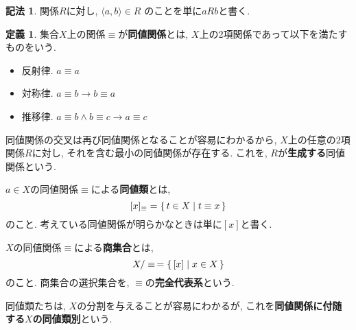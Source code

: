 \documentclass[a4paper, twoside]{bxjsarticle}
\theoremstyle{definition}
\newtheorem{defn}[thm]{定義}
\newtheorem{notation}[thm]{記法}
\begin{document}
        \begin{notation}
            関係$R$に対し, $\langle a,b \rangle \in R$ のことを単に$aRb$と書く.
        \end{notation}
        \begin{defn}
            集合$X$上の関係$\equiv$が\textbf{同値関係}とは, $X$上の2項関係であって以下を満たすものをいう.
            \begin{itemize}
                \item 反射律. $a\equiv a$
                \item 対称律. $a\equiv b \to b\equiv a$
                \item 推移律. $a\equiv b \land b\equiv c \to a\equiv c$
            \end{itemize}
            
            同値関係の交叉は再び同値関係となることが容易にわかるから, $X$上の任意の2項関係$R$に対し, それを含む最小の同値関係が存在する. これを, $R$が\textbf{生成する}同値関係という.
            
            $a\in X$の同値関係$\equiv$による\textbf{同値類}とは, \[[x]_\equiv = \set{t \in X| t \equiv x}\]のこと. 考えている同値関係が明らかなときは単に$[x]$と書く.
            
            $X$の同値関係$\equiv$による\textbf{商集合}とは, \[X/\equiv \,= \set{[x]|x\in X}\]のこと. 商集合の選択集合を, $\equiv$の\textbf{完全代表系}という.
            
            同値類たちは, $X$の分割を与えることが容易にわかるが, これを\textbf{同値関係に付随する$X$の同値類別}という.
        \end{defn}
\end{document}

